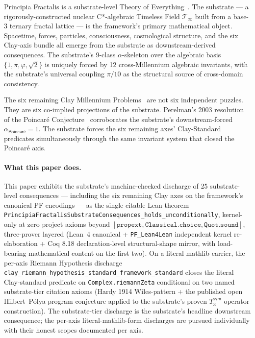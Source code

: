 \documentclass[11pt,a4paper]{amsart}
\theoremstyle{plain}
\theoremstyle{definition}
\begin{document}
Principia Fractalis is a substrate-level Theory of Everything~\cite{cohen2026book,cohen2025unifiedClay,cohen2026corroborating}. The substrate --- a rigorously-constructed nuclear C*-algebraic Timeless Field $\mathcal{T}_\infty$ built from a base-3 ternary fractal lattice --- is the framework's primary mathematical object. Spacetime, forces, particles, consciousness, cosmological structure, and the six Clay-axis bundle all emerge from the substrate as downstream-derived consequences. The substrate's 9-class $\alpha$-skeleton over the algebraic basis $\{1, \pi, \varphi, \sqrt{2}\}$ is uniquely forced by 12 cross-Millennium algebraic invariants, with the substrate's universal coupling $\pi/10$ as the structural source of cross-domain consistency.

The six remaining Clay Millennium Problems~\cite{clay2000} are not six independent puzzles. They are six co-implied projections of the substrate. Perelman's 2003 resolution of the Poincar\'e Conjecture~\cite{perelman2003} corroborates the substrate's downstream-forced $\alpha_{\textsf{Poincar\'e}} = 1$. The substrate forces the six remaining axes' Clay-Standard predicates simultaneously through the same invariant system that closed the Poincar\'e axis.

\paragraph{What this paper does.} This paper exhibits the substrate's machine-checked discharge of 25 substrate-level consequences --- including the six remaining Clay axes on the framework's canonical PF encodings --- as the single citable Lean theorem \texttt{PrincipiaFractalisSubstrateConsequences\_holds\_unconditionally}, kernel-only at zero project axioms beyond $[\texttt{propext}, \texttt{Classical.choice}, \texttt{Quot.sound}]$, three-prover layered (Lean~4 canonical + \texttt{PF\_Lean4Lean} independent kernel re-elaboration + Coq 8.18 declaration-level structural-shape mirror, with load-bearing mathematical content on the first two). On a literal mathlib carrier, the per-axis Riemann Hypothesis discharge \texttt{clay\_riemann\_hypothesis\_standard\_framework\_standard} closes the literal Clay-standard predicate on \texttt{Complex.riemannZeta} conditional on two named substrate-tier citation axioms (Hardy 1914 Wiles-pattern + the published open Hilbert--P\'olya program conjecture applied to the substrate's proven $T_3^{\textsf{sym}}$ operator construction). The substrate-tier discharge is the substrate's headline downstream consequence; the per-axis literal-mathlib-form discharges are pursued individually with their honest scopes documented per axis.
\end{document}

